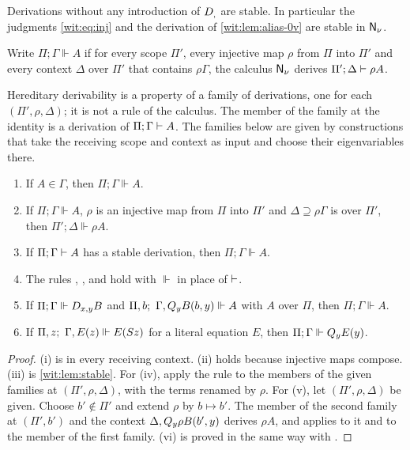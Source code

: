 Derivations without any introduction of $D_{,}$ are stable.  In particular
the judgments \eqref{wit:eq:inj} and the derivation of
\cref{wit:lem:alias-0v} are stable in $\mathsf{N}_{\nu}$.

\begin{definition}
\label{wit:def:hereditary}
Write $\Pi;\Gamma\Vdash A$ if for every scope $\Pi'$, every injective map
$\rho$ from $\Pi$ into $\Pi'$ and every context $\Delta$ over $\Pi'$ that
contains $\rho\Gamma$, the calculus $\mathsf{N}_{\nu}$ derives
$\Pi';\Delta\vdash\rho A$.
\end{definition}

Hereditary derivability is a property of a family of derivations, one for
each $(\Pi',\rho,\Delta)$; it is not a rule of the calculus.  The member of
the family at the identity is a derivation of $\Pi;\Gamma\vdash A$.  The
families below are given by constructions that take the receiving scope and
context as input and choose their eigenvariables there.

\begin{lemma}
\label{wit:lem:hereditary-closure}
\begin{enumerate}[label=\textup{(\roman*)}]
\item If $A\in\Gamma$, then $\Pi;\Gamma\Vdash A$.
\item If $\Pi;\Gamma\Vdash A$, $\rho$ is an injective map from $\Pi$ into
 $\Pi'$ and $\Delta\supseteq\rho\Gamma$ is over $\Pi'$, then
 $\Pi';\Delta\Vdash\rho A$.
\item If $\Pi;\Gamma\vdash A$ has a stable derivation, then
 $\Pi;\Gamma\Vdash A$.
\item The rules , ,  and
  hold with $\Vdash$ in place of $\vdash$.
\item If $\Pi;\Gamma\Vdash D_{x,y}B$ and
 $\Pi,b;\ \Gamma,Q_{y}B(b,y)\Vdash A$ with $A$ over $\Pi$, then
 $\Pi;\Gamma\Vdash A$.
\item If $\Pi,z;\ \Gamma,E(z)\Vdash E(S z)$ for a literal equation $E$,
 then $\Pi;\Gamma\Vdash Q_{y}E(y)$.
\end{enumerate}
\end{lemma}

\begin{proof}
(i) is  in every receiving context.  (ii) holds because
injective maps compose.  (iii) is \cref{wit:lem:stable}.  For (iv), apply
the rule to the members of the given families at $(\Pi',\rho,\Delta)$, with
the terms renamed by $\rho$.  For (v), let $(\Pi',\rho,\Delta)$ be given.
Choose $b'\notin\Pi'$ and extend $\rho$ by $b\mapsto b'$.  The member of the
second family at $(\Pi',b')$ and the context $\Delta,Q_{y}\rho B(b',y)$
derives $\rho A$, and  applies to it and to the member of the
first family.  (vi) is proved in the same way with .
\end{proof}

